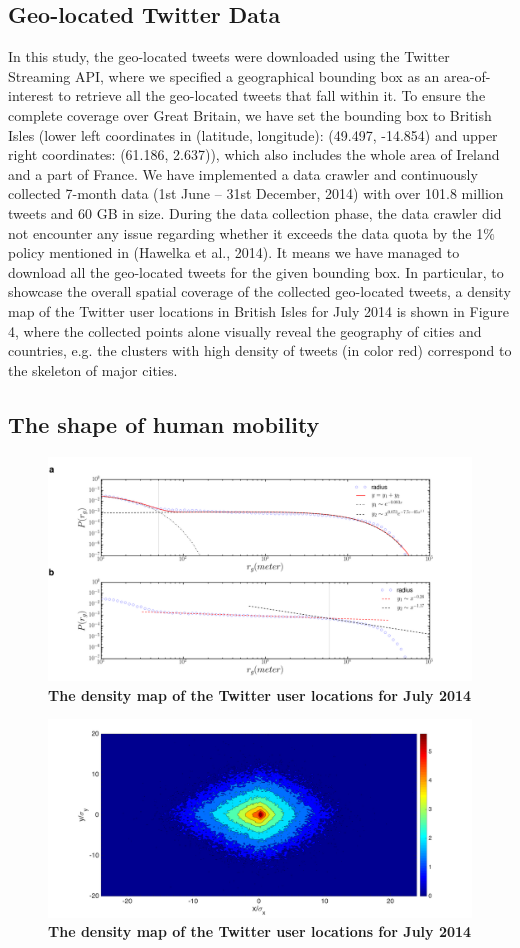 \documentclass[a4paper,11pt]{article}
\begin{document}
\subsection*{Geo-located Twitter Data}
In this study, the geo-located tweets were downloaded using the Twitter Streaming API, where we specified a geographical bounding box as an area-of-interest to retrieve all the geo-located tweets that fall within it.
To ensure the complete coverage over Great Britain, we have set the bounding box to British Isles (lower left coordinates in (latitude, longitude): (49.497, -14.854) and upper right coordinates: (61.186, 2.637)), which also includes the whole area of Ireland and a part of France.
We have implemented a data crawler and continuously collected 7-month data (1st June – 31st December, 2014) with over 101.8 million tweets and 60 GB in size.
During the data collection phase, the data crawler did not encounter any issue regarding whether it exceeds the data quota by the 1$\%$ policy mentioned in (Hawelka et al., 2014).
It means we have managed to download all the geo-located tweets for the given bounding box.
In particular, to showcase the overall spatial coverage of the collected geo-located tweets, a density map of the Twitter user locations in British Isles for July 2014 is shown in Figure 4, where the collected points alone visually reveal the geography of cities and countries, e.g. the clusters with high density of tweets (in color red) correspond to the skeleton of major cities.
  
\subsection*{The shape of human mobility}

\begin{figure}[ht]
	\includegraphics[width=1.0\linewidth]{./figure/gyration_chicago}
	\caption{{\bf The density map of the Twitter user locations for July 2014}}
	\label{Fig_gyration}
\end{figure}


\begin{figure}[ht]
	\includegraphics[width=1.0\linewidth]{./figure/Chicago_Shape}
	\caption{{\bf The density map of the Twitter user locations for July 2014}}
	\label{Fig_shape}
\end{figure}
\end{document}
